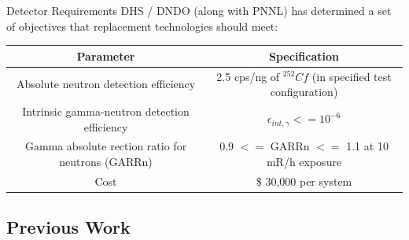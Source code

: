 \documentclass{beamer}
\begin{document}
\begin{frame}{Detector Requirements}
DHS / DNDO (along with PNNL) has determined a set of objectives that replacement technologies should meet:
\begin{table}\footnotesize
	\tiny
	\begin{tabular}{c c }
	Parameter & Specification \\
	\hline
	\hline
	Absolute neutron detection efficiency & 2.5 cps/ng of ${}^{252}Cf$ (in specified test configuration) \\
	Intrinsic gamma-neutron detection efficiency & $ \epsilon_{int,\gamma} <= 10^{-6}$ \\
	Gamma absolute rection ratio for neutrons (GARRn) &  0.9 $<=$ GARRn $<=$ 1.1 at 10 mR/h exposure \\
	Cost &  \$ 30,000 per system \\
	\hline
	\end{tabular}
\end{table}
\end{frame}

\subsection{Previous Work}
\end{document}
